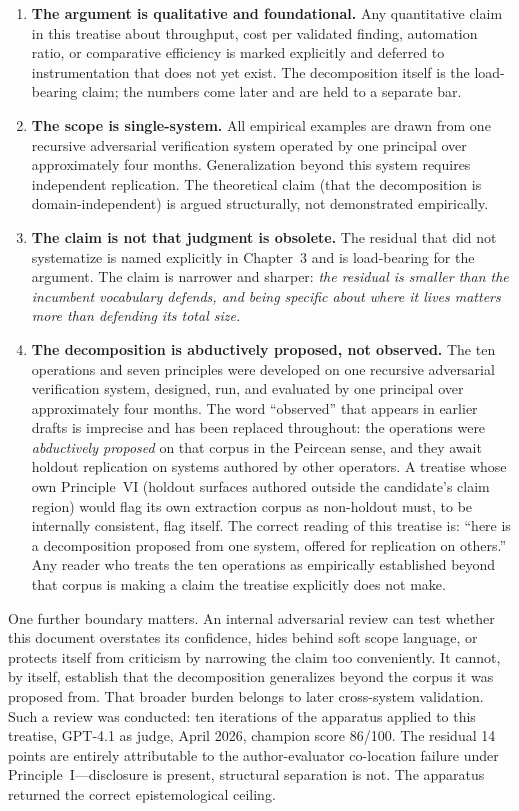\documentclass[11pt]{article}
\begin{document}
\begin{enumerate}
\item \textbf{The argument is qualitative and foundational.} Any quantitative claim in this treatise about throughput, cost per validated finding, automation ratio, or comparative efficiency is marked explicitly and deferred to instrumentation that does not yet exist. The decomposition itself is the load-bearing claim; the numbers come later and are held to a separate bar.

\item \textbf{The scope is single-system.} All empirical examples are drawn from one recursive adversarial verification system operated by one principal over approximately four months. Generalization beyond this system requires independent replication. The theoretical claim (that the decomposition is domain-independent) is argued structurally, not demonstrated empirically.

\item \textbf{The claim is not that judgment is obsolete.} The residual that did not systematize is named explicitly in Chapter~3 and is load-bearing for the argument. The claim is narrower and sharper: \emph{the residual is smaller than the incumbent vocabulary defends, and being specific about where it lives matters more than defending its total size.}

\item \textbf{The decomposition is abductively proposed, not observed.} The ten operations and seven principles were developed on one recursive adversarial verification system, designed, run, and evaluated by one principal over approximately four months. The word ``observed'' that appears in earlier drafts is imprecise and has been replaced throughout: the operations were \emph{abductively proposed} on that corpus in the Peircean sense, and they await holdout replication on systems authored by other operators. A treatise whose own Principle~VI (holdout surfaces authored outside the candidate's claim region) would flag its own extraction corpus as non-holdout must, to be internally consistent, flag itself. The correct reading of this treatise is: ``here is a decomposition proposed from one system, offered for replication on others.'' Any reader who treats the ten operations as empirically established beyond that corpus is making a claim the treatise explicitly does not make.
\end{enumerate}

One further boundary matters. An internal adversarial review can test whether this document overstates its confidence, hides behind soft scope language, or protects itself from criticism by narrowing the claim too conveniently. It cannot, by itself, establish that the decomposition generalizes beyond the corpus it was proposed from. That broader burden belongs to later cross-system validation. Such a review was conducted: ten iterations of the apparatus applied to this treatise, GPT-4.1 as judge, April 2026, champion score 86/100. The residual 14 points are entirely attributable to the author-evaluator co-location failure under Principle~I---disclosure is present, structural separation is not. The apparatus returned the correct epistemological ceiling.
\end{document}
